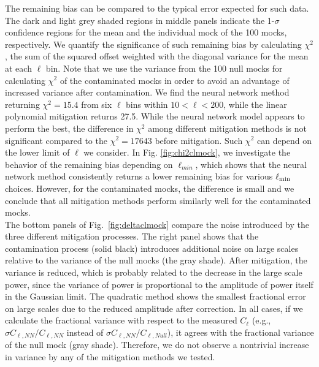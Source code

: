 \documentclass[fleqn, usenatbib]{mnras}
\begin{document}
The remaining bias can be compared to the typical error expected for such data. The dark and light grey shaded regions in middle panels indicate the 1-$\sigma$ confidence regions for the mean and the individual mock of the 100 mocks, respectively.  We quantify the significance of such remaining bias by calculating $\chi^2$, the sum of the squared offset weighted with the diagonal variance for the mean at each $\ell$ bin. Note that we use the variance from the 100 null mocks for calculating $\chi^2$ of the contaminated mocks in order to avoid an advantage of increased variance after contamination. We find the neural network method returning $\chi^2=15.4$ from six $\ell$ bins within $10<\ell <200$, while the linear polynomial mitigation returns 27.5. While the neural network model appears to perform the best, the difference in $\chi^2$ among different mitigation methods is not significant compared to the $\chi^2=17643$ before mitigation. 
 Such $\chi^2$ can depend on the lower limit of $\ell$ we consider. In Fig. \ref{fig:chi2clmock}, we investigate the behavior of the remaining bias depending on $\ell_{min}$, which shows that the neural network method consistently returns a lower remaining bias for various $\ell_{\rm min}$ choices. However, for the contaminated mocks, the difference is small and we conclude that all mitigation methods perform similarly well for the contaminated mocks. \\

The bottom panels of Fig.~\ref{fig:deltaclmock} compare the noise introduced by the three different mitigation processes. The right panel shows that the contamination process (solid black) introduces additional noise on large scales relative to the variance of the null mocks (the gray shade). After mitigation, the variance is reduced, which is probably related to the decrease in the large scale power, since the variance of power is proportional to the amplitude of power itself in the Gaussian limit. The quadratic method shows the smallest fractional error on large scales due to the reduced amplitude after correction. In all cases, if we calculate the fractional variance with respect to the measured $C_\ell$ (e.g., $\sigma C_{\ell, NN}/C_{\ell, NN}$ instead of  $\sigma C_{\ell, NN}/C_{\ell, Null}$), it agrees with the fractional variance of the null mock (gray shade). Therefore, we do not observe a nontrivial increase in variance by any of the mitigation methods we tested. \\
\end{document}
